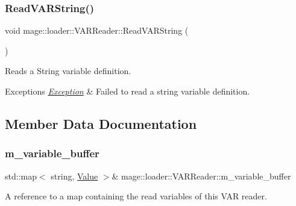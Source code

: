 \subsubsection{\texorpdfstring{Read\+V\+A\+R\+String()}{ReadVARString()}}
{\footnotesize\ttfamily void mage\+::loader\+::\+V\+A\+R\+Reader\+::\+Read\+V\+A\+R\+String (\begin{DoxyParamCaption}{ }\end{DoxyParamCaption})\hspace{0.3cm}{\ttfamily [private]}}

Reads a String variable definition.


\begin{DoxyExceptions}{Exceptions}
{\em \hyperlink{classmage_1_1_exception}{Exception}} & Failed to read a string variable definition. \\
\hline
\end{DoxyExceptions}


\subsection{Member Data Documentation}
\hypertarget{classmage_1_1loader_1_1_v_a_r_reader_a71291d47ea9f9d679bfd7584447ae6bb}{}\label{classmage_1_1loader_1_1_v_a_r_reader_a71291d47ea9f9d679bfd7584447ae6bb} 
\subsubsection{\texorpdfstring{m\+\_\+variable\+\_\+buffer}{m\_variable\_buffer}}
{\footnotesize\ttfamily std\+::map$<$ string, \hyperlink{namespacemage_aa1fe0628487e0706e44efdc62dbdb3a2}{Value} $>$\& mage\+::loader\+::\+V\+A\+R\+Reader\+::m\+\_\+variable\+\_\+buffer\hspace{0.3cm}{\ttfamily [private]}}

A reference to a map containing the read variables of this V\+AR reader. 